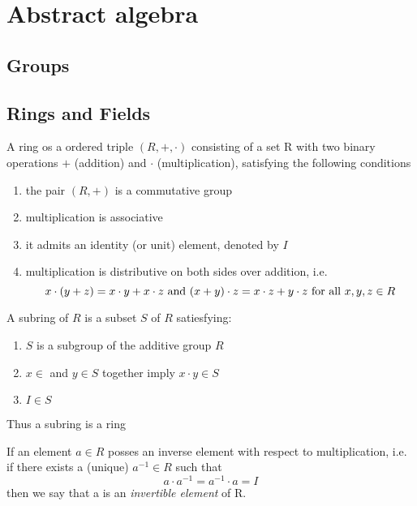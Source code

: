 \chapter{Abstract algebra}

\section{Groups}


\section{Rings and Fields}
A ring os a ordered triple $(R, +, \cdot)$ consisting of a set R with two binary operations $+$ (addition) and $\cdot$ (multiplication), satisfying the following conditions

\begin{enumerate}
\item the pair $(R, +)$ is a commutative group
\item multiplication is associative
\item it admits an identity (or unit) element, denoted by $I$
\item multiplication is distributive on both sides over addition, i.e.
\[
x \cdot (y + z) = x \cdot y + x \cdot z
\textnormal{ and }
(x+y) \cdot z = x \cdot z + y \cdot z
\textnormal{ for all } x,y,z \in R
\]
\end{enumerate}

\noindent A subring of $R$ is a subset $S$ of $R$ satiesfying:
\begin{enumerate}
\item $S$ is a subgroup of the additive group $R$
\item $x \in $ and $y \in S$ together imply $x \cdot y \in S$
\item $I \in S$
\end{enumerate}
Thus a subring is a ring

If an element $a \in R$ posses an inverse element with respect to multiplication, i.e. if there exists a (unique) $a^{-1} \in R$ such that
\[
a \cdot a^{-1} = a^{-1} \cdot a = I
\]
then we say that a is an \textit{invertible element} of R.


